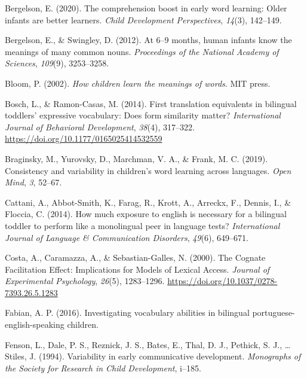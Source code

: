 \documentclass[
  english,
  man,man,floatsintext]{apa6}
\newlength{\cslhangindent}
\newenvironment{CSLReferences}[2] %
 {%
  \setlength{\parindent}{0pt}
  \ifodd #1 \everypar{\setlength{\hangindent}{\cslhangindent}}\ignorespaces\fi
  \ifnum #2 > 0
  \setlength{\parskip}{#2\baselineskip}
  \fi
 }%
 {}
\begin{document}
\hypertarget{refs}{}
\begin{CSLReferences}{1}{0}
\leavevmode{}%
Bergelson, E. (2020). The comprehension boost in early word learning: Older infants are better learners. \emph{Child Development Perspectives}, \emph{14}(3), 142--149.

\leavevmode{}%
Bergelson, E., \& Swingley, D. (2012). At 6--9 months, human infants know the meanings of many common nouns. \emph{Proceedings of the National Academy of Sciences}, \emph{109}(9), 3253--3258.

\leavevmode{}%
Bloom, P. (2002). \emph{How children learn the meanings of words}. MIT press.

\leavevmode{}%
Bosch, L., \& Ramon-Casas, M. (2014). First translation equivalents in bilingual toddlers' expressive vocabulary: {Does} form similarity matter? \emph{International Journal of Behavioral Development}, \emph{38}(4), 317--322. \url{https://doi.org/10.1177/0165025414532559}

\leavevmode{}%
Braginsky, M., Yurovsky, D., Marchman, V. A., \& Frank, M. C. (2019). Consistency and variability in children's word learning across languages. \emph{Open Mind}, \emph{3}, 52--67.

\leavevmode{}%
Cattani, A., Abbot-Smith, K., Farag, R., Krott, A., Arreckx, F., Dennis, I., \& Floccia, C. (2014). How much exposure to english is necessary for a bilingual toddler to perform like a monolingual peer in language tests? \emph{International Journal of Language \& Communication Disorders}, \emph{49}(6), 649--671.

\leavevmode{}%
Costa, A., Caramazza, A., \& Sebastian-Galles, N. (2000). The {Cognate} {Facilitation} {Effect}: {Implications} for {Models} of {Lexical} {Access}. \emph{Journal of Experimental Psychology}, \emph{26}(5), 1283--1296. \url{https://doi.org/10.1037/0278-7393.26.5.1283}

\leavevmode{}%
Fabian, A. P. (2016). Investigating vocabulary abilities in bilingual portuguese-english-speaking children.

\leavevmode{}%
Fenson, L., Dale, P. S., Reznick, J. S., Bates, E., Thal, D. J., Pethick, S. J., \ldots{} Stiles, J. (1994). Variability in early communicative development. \emph{Monographs of the Society for Research in Child Development}, i--185.


\end{CSLReferences}
\end{document}

